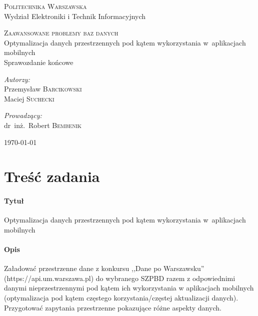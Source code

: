 \documentclass[11pt,a4paper]{article}
\begin{document}
\begin{titlepage}
  \begin{center}

    \textsc{\Large Politechnika Warszawska}\\[0.1cm]
    \small Wydział Elektroniki i Technik Informacyjnych
    \vfill

    \textsc{\small Zaawansowane problemy baz danych}\\[0.1cm]
    \Huge Optymalizacja danych przestrzennych pod kątem wykorzystania w~aplikacjach mobilnych\\[1.5cm]
    \small Sprawozdanie końcowe\\[2.5cm]

    \vfill

    \begin{minipage}{0.4\textwidth}
      \begin{flushleft} \large
        \emph{Autorzy:}\\[0.1cm]
        Przemysław \textsc{Barcikowski}\\
        Maciej \textsc{Suchecki}\\
      \end{flushleft}
    \end{minipage}
    \begin{minipage}{0.4\textwidth}
      \begin{flushright} \large
        \emph{Prowadzący:}\\[0.1cm]
        dr~inż.~Robert \textsc{Bembenik}\\[1cm]
      \end{flushright}
    \end{minipage}

    \vfill
    {\large \today}

  \end{center}
\end{titlepage}

\section{Treść zadania}
\paragraph{Tytuł} Optymalizacja danych przestrzennych pod kątem wykorzystania w~aplikacjach mobilnych
\paragraph{Opis}
Załadować przestrzenne dane z konkursu ,,Dane po Warszawsku'' (https://api.um.warszawa.pl) do wybranego SZPBD razem z odpowiednimi danymi nieprzestrzennymi pod kątem ich wykorzystania w aplikacjach mobilnych (optymalizacja pod kątem częstego korzystania/częstej aktualizacji danych). Przygotować zapytania przestrzenne pokazujące różne aspekty danych.
\end{document}
